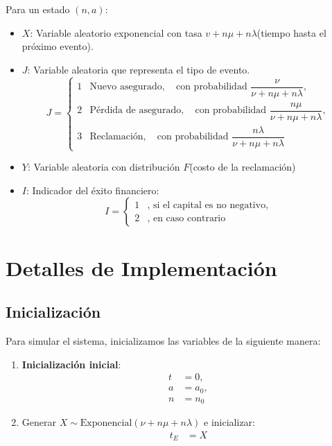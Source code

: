 \documentclass[12pt, a4paper]{article}
\begin{document}
Para un estado $(n,a)$:
\begin{itemize}
    \item $X$: Variable aleatorio exponencial con tasa $v+n\mu+n\lambda$(tiempo hasta el próximo evento).
    \item $J$: Variable aleatoria que representa el tipo de evento.
        \begin{equation}
            J = 
            \begin{cases}
                1 & \text{Nuevo asegurado}, \quad \text{con probabilidad } \dfrac{\nu}{\nu + n\mu + n\lambda}, \\
                2 & \text{Pérdida de asegurado}, \quad \text{con probabilidad } \dfrac{n\mu}{\nu + n\mu + n\lambda}, \\
                3 & \text{Reclamación}, \quad \text{con probabilidad } \dfrac{n\lambda}{\nu + n\mu + n\lambda}
            \end{cases}
        \end{equation}
    \item $Y$: Variable aleatoria con distribución $F$(costo de la reclamación)
    \item $I$: Indicador del éxito financiero:
        \begin{equation}
            I =
            \begin{cases}
                1 & \text{, si el capital es no negativo}, \\
                2 & \text{, en caso contrario}
            \end{cases}
        \end{equation}
\end{itemize}

\section{Detalles de Implementación} \label{S2}

\subsection*{Inicialización}
Para simular el sistema, inicializamos las variables de la siguiente manera:

\begin{enumerate}
    \item \textbf{Inicialización inicial}:
    \begin{align*}
        t &= 0, \\
        a &= a_0, \\
        n &= n_0
    \end{align*}
    
    \item Generar $X \sim \text{Exponencial}(\nu + n\mu + n\lambda)$ e inicializar:
    \begin{align*}
        t_E &= X
    \end{align*}
\end{enumerate}
\end{document}

